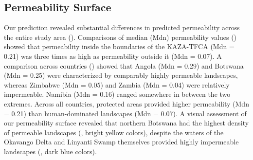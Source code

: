 \documentclass[abstract=on,10pt,a4paper,bibliography=totocnumbered]{scrartcl}
\begin{document}
\subsection{Permeability Surface}
Our prediction revealed substantial differences in predicted permeability across
the entire study area (). Comparisons of median (Mdn)
permeability values () showed that permeability inside
the boundaries of the KAZA-TFCA (Mdn = 0.21) was three times as high as
permeability outside it (Mdn = 0.07). A comparison across countries
() showed that Angola (Mdn = 0.29) and Botswana (Mdn =
0.25) were characterized by comparably highly permeable landscapes, whereas
Zimbabwe (Mdn = 0.05) and Zambia (Mdn = 0.04) were relatively impermeable.
Namibia (Mdn = 0.16) ranged somewhere in between the two extremes. Across all
countries, protected areas provided higher permeability (Mdn = 0.21) than
human-dominated landscapes (Mdn = 0.07). A visual assessment of our permeability
surface revealed that northern Botswana had the highest density of permeable
landscapes (, bright yellow colors), despite the waters
of the Okavango Delta and Linyanti Swamp themselves provided highly impermeable
landscapes (, dark blue colors).
\end{document}
